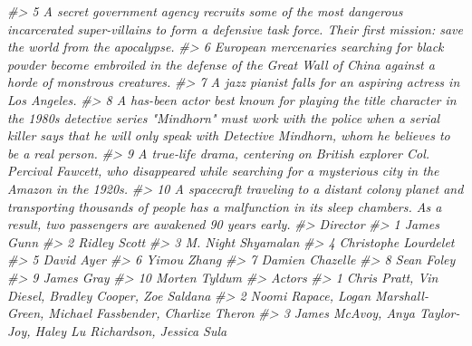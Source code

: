 \documentclass[
]{book}
\newenvironment{Shaded}{\begin{snugshade}}{\end{snugshade}}
\newcommand{\CommentTok}[1]{\textcolor[rgb]{0.56,0.35,0.01}{\textit{#1}}}
\begin{document}
\begin{Shaded}
\begin{Highlighting}[]
\CommentTok{\#\textgreater{} 5                                                              A secret government agency recruits some of the most dangerous incarcerated super{-}villains to form a defensive task force. Their first mission: save the world from the apocalypse.}
\CommentTok{\#\textgreater{} 6                                                                                               European mercenaries searching for black powder become embroiled in the defense of the Great Wall of China against a horde of monstrous creatures.}
\CommentTok{\#\textgreater{} 7                                                                                                                                                                                     A jazz pianist falls for an aspiring actress in Los Angeles.}
\CommentTok{\#\textgreater{} 8  A has{-}been actor best known for playing the title character in the 1980s detective series "Mindhorn" must work with the police when a serial killer says that he will only speak with Detective Mindhorn, whom he believes to be a real person.}
\CommentTok{\#\textgreater{} 9                                                                                        A true{-}life drama, centering on British explorer Col. Percival Fawcett, who disappeared while searching for a mysterious city in the Amazon in the 1920s.}
\CommentTok{\#\textgreater{} 10                                                        A spacecraft traveling to a distant colony planet and transporting thousands of people has a malfunction in its sleep chambers. As a result, two passengers are awakened 90 years early.}
\CommentTok{\#\textgreater{}                Director}
\CommentTok{\#\textgreater{} 1            James Gunn}
\CommentTok{\#\textgreater{} 2          Ridley Scott}
\CommentTok{\#\textgreater{} 3    M. Night Shyamalan}
\CommentTok{\#\textgreater{} 4  Christophe Lourdelet}
\CommentTok{\#\textgreater{} 5            David Ayer}
\CommentTok{\#\textgreater{} 6           Yimou Zhang}
\CommentTok{\#\textgreater{} 7       Damien Chazelle}
\CommentTok{\#\textgreater{} 8            Sean Foley}
\CommentTok{\#\textgreater{} 9            James Gray}
\CommentTok{\#\textgreater{} 10        Morten Tyldum}
\CommentTok{\#\textgreater{}                                                                        Actors}
\CommentTok{\#\textgreater{} 1                        Chris Pratt, Vin Diesel, Bradley Cooper, Zoe Saldana}
\CommentTok{\#\textgreater{} 2     Noomi Rapace, Logan Marshall{-}Green, Michael Fassbender, Charlize Theron}
\CommentTok{\#\textgreater{} 3            James McAvoy, Anya Taylor{-}Joy, Haley Lu Richardson, Jessica Sula}

\end{Highlighting}
\end{Shaded}
\end{document}
